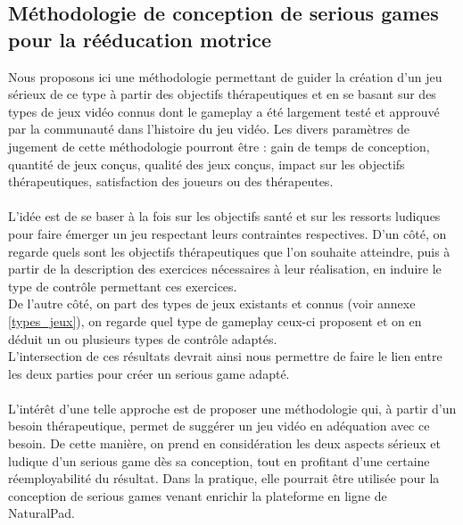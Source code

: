 \subsection*{Méthodologie de conception de serious games pour la rééducation motrice}
Nous proposons ici une méthodologie permettant de guider la création d’un jeu sérieux de ce type à partir des objectifs thérapeutiques et en se basant sur des types de jeux vidéo connus dont le gameplay a été largement testé et approuvé par la communauté dans l’histoire du jeu vidéo. Les divers paramètres de jugement de cette méthodologie pourront être : gain de temps de conception, quantité de jeux conçus, qualité des jeux conçus, impact sur les objectifs thérapeutiques, satisfaction des joueurs ou des thérapeutes.

\paragraph{}L’idée est de se baser à la fois sur les objectifs santé et sur les ressorts ludiques pour faire émerger un jeu respectant leurs contraintes respectives.
D’un côté, on regarde quels sont les objectifs thérapeutiques que l’on souhaite atteindre, puis à partir de la description des exercices nécessaires à leur réalisation, en induire le type de contrôle permettant ces exercices.\\
De l’autre côté, on part des types de jeux existants et connus (voir annexe \ref{types_jeux}), on regarde quel type de gameplay ceux-ci proposent et on en déduit un ou plusieurs types de contrôle adaptés.\\
L’intersection de ces résultats devrait ainsi nous permettre de faire le lien entre les deux parties pour créer un serious game adapté. 

\paragraph{}L’intérêt d’une telle approche est de proposer une méthodologie qui, à partir d’un besoin thérapeutique, permet de suggérer un jeu vidéo en adéquation avec ce besoin. De cette manière, on prend en considération les deux aspects sérieux et ludique d’un serious game dès sa conception, tout en profitant d’une certaine réemployabilité du résultat. Dans la pratique, elle pourrait être utilisée pour la conception de serious games venant enrichir la plateforme en ligne de NaturalPad. 

